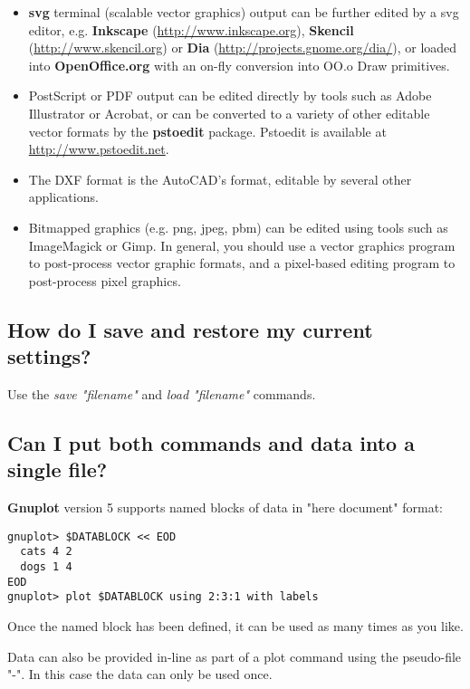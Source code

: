 \documentclass[a4paper,11pt]{article}
\def\http#1{{\small\href{http://#1}{\url{http://#1}}}}
\newcommand{\http}[1]%
            {\htmladdnormallink{\latex{\url{http://#1}}%
                    \html{\textit{http://#1}}}%
                {http://#1}%
            }
\newcommand{\Gnuplot}{\textbf{Gnuplot }}
\begin{document}
\begin{itemize}

\item \textbf{svg} terminal (scalable vector graphics) output can
be further edited by a svg editor, e.g.
\textbf{Inkscape} (\http{www.inkscape.org}),
\textbf{Skencil} (\http{www.skencil.org}) or
\textbf{Dia} (\http{projects.gnome.org/dia/}), or loaded
into \textbf{OpenOffice.org} with an on-fly conversion into OO.o Draw
primitives.

\item PostScript or PDF output can be edited directly by tools such
as Adobe Illustrator or Acrobat, or can be converted to a variety
of other editable vector formats by the \textbf{pstoedit} package.
Pstoedit is available at \http{www.pstoedit.net}.

\item The DXF format is the AutoCAD's format, editable by several
other applications.

\item Bitmapped graphics (e.g. png, jpeg, pbm) can be edited using
tools such as ImageMagick or Gimp.
In general, you should use a vector graphics program to post-process
vector graphic formats, and a pixel-based editing program
to post-process pixel graphics.

\end{itemize}

\subsection{How do I save and restore my current settings?}

Use the {\em save "filename"} and {\em load "filename"} commands.

\subsection{Can I put both commands and data into a single file?}

\Gnuplot version 5 supports named blocks of data in "here document" format:
\small
\begin{verbatim}
gnuplot> $DATABLOCK << EOD
  cats 4 2
  dogs 1 4
EOD
gnuplot> plot $DATABLOCK using 2:3:1 with labels
\end{verbatim}
\normalsize
Once the named block has been defined, it can be used as many times
as you like.

Data can also be provided in-line as part of a plot command using the
pseudo-file "-".  In this case the data can only be used once.
\end{document}
